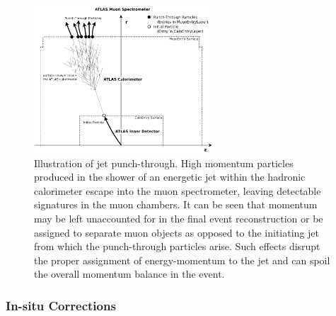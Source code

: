 \begin{figure}[!htb]
    \begin{center}
        \includegraphics[width=0.6\textwidth]{figures/chapter3/jets/jet_punch_through}
        \caption{
            Illustration of jet punch-through.
            High momentum particles produced in the shower of an energetic jet within
            the hadronic calorimeter escape into the muon spectrometer, leaving detectable
            signatures in the muon chambers.
            It can be seen that momentum may be left unaccounted for in the final event reconstruction or be assigned to separate muon objects as opposed to the
            initiating jet from which the punch-through particles arise.
            Such effects disrupt the proper
            assignment of energy-momentum to the jet and can spoil the overall momentum balance in the event.
        }
        \label{fig:jet_punch_through}
    \end{center}
\end{figure}

\subsubsection{In-situ Corrections}
\label{sec:jet_in_situ}

